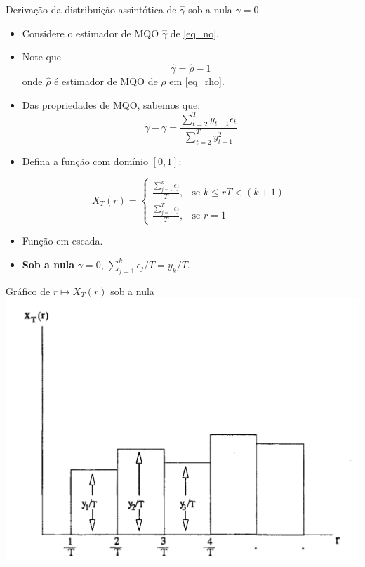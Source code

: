 \documentclass[11pt]{beamer}
\begin{document}
\appendix
\begin{frame}{Derivação da distribuição assintótica de $\hat{\gamma}$ sob a nula $\gamma = 0$ }
	\label{app_donsker}
	
	\begin{itemize}
		\item Considere o estimador de MQO $\hat{\gamma}$ de \eqref{eq_no}.
		\item Note que
		$$\hat{\gamma} = \hat{\rho} - 1$$
		onde $\hat{\rho}$ é estimador de MQO de $\rho$ em \eqref{eq_rho}.
		\item Das propriedades de MQO, sabemos que:
		$$\hat{\gamma} -  \gamma = \frac{\sum_{t=2}^T y_{t-1}\epsilon_t}{\sum_{t=2}^T y_{t-1}^2}$$
		\item Defina a função com domínio $[0,1]$:
		
		$$X_T(r) = \begin{cases}
						\frac{\sum_{j=1}^{k}\epsilon_j}{T},& \text{se } k\leq r T <  (k+1)\, \\
						\frac{\sum_{j=1}^{T}\epsilon_j}{T}, & \text{se } r = 1
		\end{cases}$$

		\item Função em escada.
		\item \textbf{Sob a nula} $\gamma = 0$, $\sum_{j=1}^{k}\epsilon_j/T=  y_k/T$.
	\end{itemize}
\end{frame}

\begin{frame}{Gráfico de $r \mapsto X_T(r)$ sob a nula}
	\centering
	\includegraphics[scale=0.5]{graficos/escada.png}
\end{frame}
\end{document}
